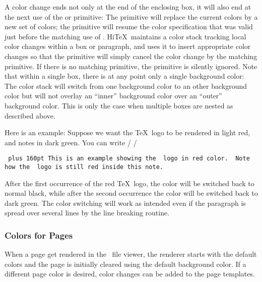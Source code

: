 A color change ends not only at the end of the enclosing box,
it will also end at the next use of the 
or  primitive:
The  primitive will replace the current colors by
a new set of colors; the  primitive will resume
the color specification that was valid just before the matching use
of . Hi\TeX\ maintains a color stack tracking
local color changes within a box or paragraph, and uses it to
insert appropriate color changes so that the  primitive
will simply cancel the color change by the matching  primitive.
If there is no matching  primitive,
the  primitive is silently ignored.
Note that within a single box, there is at any point only a single
background color: The color stack will switch from one background
color to an other background color but will not overlay an ``inner''
background color over an ``outer'' background color.
This is only the case when multiple boxes are nested as described above.

Here is an example:
Suppose we want the \TeX\ logo to be rendered in light red,
and notes in dark green. You can write
\medskip
\verbatim/\def\redTeX{\HINTcolor{fg{1 0.3 0.3}}\TeX\HINTendcolor}
\def\beginnote{\HINTcolor{fg{0 0.5 0}}}
\def\endnote{\HINTendcolor}/
\medskip
{\tt\parindent 0pt\rightskip=0pt plus 160pt
This is an example showing the \BS\ logo in red color.
\ Note how the \BS\ logo is still red inside
this note.\par}
\medskip

After the first occurrence of the red \TeX\ logo, the color will be switched
back to normal black, while after the second occurrence the color will
be switched back to dark green. The color switching will work as intended
even if the paragraph is spread over several lines by the line breaking routine.


\subsubsection{Colors for Pages}
When a page get rendered in the \HINT\ file viewer,
the renderer starts with the default colors and the page is initially
cleared using the default background color. If a different page
color is desired, color changes can be added to the page templates.

